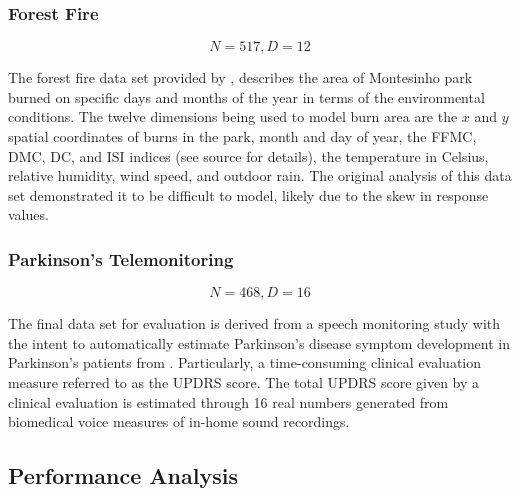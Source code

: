 \subsubsection{Forest Fire}
$$N = 517, D = 12$$

The forest fire data set provided by \cite{cortez2007data}, describes the area of Montesinho park burned on specific days and months of the year in terms of the environmental conditions. The twelve dimensions being used to model burn area are the $x$ and $y$ spatial coordinates of burns in the park, month and day of year, the FFMC, DMC, DC, and ISI indices (see source for details), the temperature in Celsius, relative humidity, wind speed, and outdoor rain. The original analysis of this data set demonstrated it to be difficult to model, likely due to the skew in response values.

\subsubsection{Parkinson's Telemonitoring}
$$N = 468, D = 16$$

The final data set for evaluation is derived from a speech monitoring study with the intent to automatically estimate Parkinson's disease symptom development in Parkinson's patients from \cite{tsanas2010accurate}. Particularly, a time-consuming clinical evaluation measure referred to as the UPDRS score. The total UPDRS score given by a clinical evaluation is estimated through 16 real numbers generated from biomedical voice measures of in-home sound recordings.

\subsection{Performance Analysis}
\label{sec_performance_analysis}


